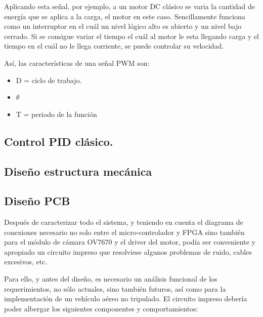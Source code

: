 Aplicando esta señal, por ejemplo, a un motor DC clásico se varia la cantidad de energía que se aplica a la carga, el motor en este caso. Sencillamente funciona como un interruptor en el cuál un nivel lógico alto es abierto y un nivel bajo cerrado. Si se consigue variar el tiempo el cuál al motor le esta llegando carga y el tiempo en el cuál no le llega corriente, se puede controlar su velocidad. \newline

Así, las características de una señal PWM son: 
\begin{itemize}
	\item D = ciclo de trabajo.
	\item $\theta$
	\item T = periodo de la función
\end{itemize}



\subsection{Control PID clásico.}
\subsection{Diseño estructura mecánica}
\subsection{Diseño PCB}\label{sec:DisenoPCB} 
Después de caracterizar todo el sistema, y teniendo en cuenta el diagrama de conexiones necesario no solo entre el micro-controlador y FPGA sino también para el módulo de cámara OV7670 y el driver del motor, podía ser conveniente y apropiado un circuito impreso que resolviese algunos problemas de ruido, cables excesivos, etc. \newline

Para ello, y antes del diseño, es necesario un análisis funcional de los requerimientos, no sólo actuales, sino también futuros, así como para la implementación de un vehículo aéreo no tripulado. El circuito impreso debería poder albergar los siguientes componentes y comportamientos:

